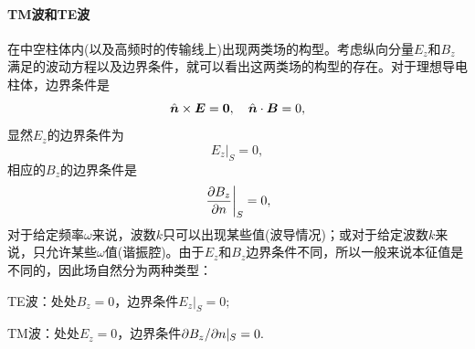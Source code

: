 \paragraph{TM波和TE波}
在中空柱体内(以及高频时的传输线上)出现两类场的构型。考虑纵向分量$E_z$和$B_z$满足的波动方程以及边界条件，就可以看出这两类场的构型的存在。对于理想导电柱体，边界条件是
\[
    \mathop{}\!\hat{\bm n}\times\bm E=\bm0,\quad\mathop{}\!\hat{\bm n}\cdot\bm B=0,
\]
显然$E_z$的边界条件为
\begin{equation}
    E_z|_S=0,
\end{equation}
相应的$B_z$的边界条件是
\begin{equation}
    \left.\frac{\partial^{\;\!\!}B_z}{\partial n^{\;\!\!}}\right\rvert_S=0,
\end{equation}
对于给定频率$\omega$来说，波数$k$只可以出现某些值(波导情况)；或对于给定波数$k$来说，只允许某些$\omega$值(谐振腔)。由于$E_z$和$B_z$边界条件不同，所以一般来说本征值是不同的，因此场自然分为两种类型：
\begin{compactitem}
	\item TE波：处处$B_z=0$，边界条件$E_z|_S=0;$
	\item TM波：处处$E_z=0$，边界条件$\partial B_z/\partial n|_S=0.$
\end{compactitem}
